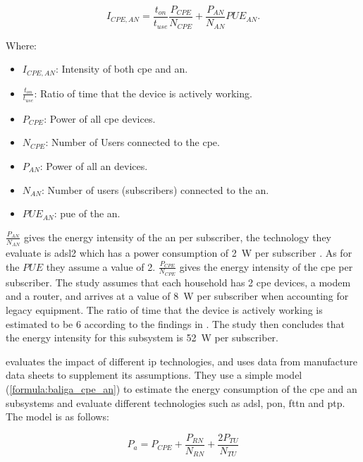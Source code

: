 \begin{equation}
\label{formula:coroama_cpe_an}
    I_{CPE,AN} = \frac{t_{on}}{t_{use}} \frac{P_{CPE}}{N_{CPE}} + \frac{P_{AN}}{N_{AN}} PUE_{AN}.
\end{equation}

Where: 

\begin{itemize}
    \item $I_{CPE,AN}$: Intensity of both \ac{cpe} and \ac{an}.
    \item $\frac{t_{on}}{t_{use}}$: Ratio of time that the device is actively working. 
    \item $P_{CPE}$: Power of all \ac{cpe} devices.
    \item $N_{CPE}$: Number of Users connected to the \ac{cpe}.
    \item $P_{AN}$: Power of all \ac{an} devices.
    \item $N_{AN}$: Number of users (subscribers) connected to the \ac{an}.
    \item $PUE_{AN}$: \ac{pue} of the \ac{an}.
\end{itemize}

$\frac{P_{AN}}{N_{AN}}$ gives the energy intensity of the \ac{an} per subscriber, the technology they evaluate is \ac{adsl}2 which has a power consumption of \SI{2}{\watt} per subscriber \citet{Schien2013}. As for the $PUE$ they assume a value of 2. 
$\frac{P_{CPE}}{N_{CPE}}$ gives the energy intensity of the \ac{cpe} per subscriber. The study assumes that each household has 2 \ac{cpe} devices, a modem and a router, and arrives at a value of \SI{8}{\watt} per subscriber when accounting for legacy equipment. 
The ratio of time that the device is actively working is estimated to be 6 according to the findings in \citet{Nissen2007}.
The study then concludes that the energy intensity for this subsystem is \SI{52}{\watt} per subscriber.


\citet{Baliga2009} evaluates the impact of different \ac{ip} technologies, and uses data from manufacture data sheets to supplement its assumptions. They use a simple model (\ref{formula:baliga_cpe_an}) to estimate the energy consumption of the \ac{cpe} and \ac{an} subsystems and evaluate different technologies such as \ac{adsl}, \ac{pon}, \ac{fttn} and \ac{ptp}. The model is as follows:  

\begin{equation}
\label{formula:baliga_cpe_an}
    P_a = P_{CPE} + \frac{P_{RN}}{N_{RN}} + \frac{2P_{TU}}{N_{TU}}
\end{equation}

